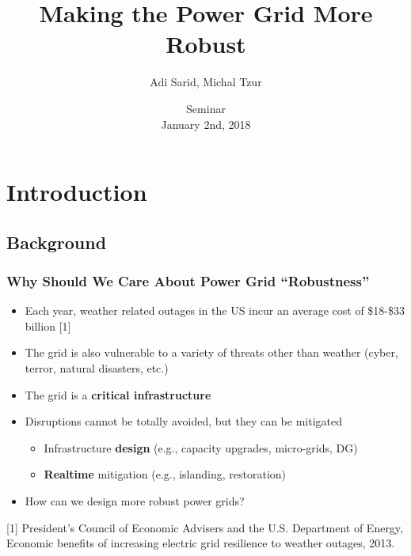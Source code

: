 \documentclass{beamer}
\title[Making the Power Grid More Robust]{Making the Power Grid More Robust}
\author[Sarid, Tzur]{Adi Sarid, Michal Tzur}
\institute[Tel-Aviv University]{\normalsize Department of Industrial Engineering, Tel-Aviv University, Israel}
\date{Seminar\\January 2nd, 2018}
\begin{document}
\begin{frame}
  \titlepage
\end{frame}


\section{Introduction}
\subsection{Background}
\begin{frame}
\frametitle{Why Should We Care About Power Grid ``Robustness''}
\begin{itemize}
	\item Each year, weather related outages in the US incur an average cost of \$18-\$33 billion [1]
	\item The grid is also vulnerable to a variety of threats other than weather (cyber, terror, natural disasters, etc.)
	\item The grid is a \textbf{critical infrastructure}
	\item Disruptions cannot be totally avoided, but they can be mitigated
	\begin{itemize}
		\item Infrastructure \textbf{design} (e.g., capacity upgrades, micro-grids, DG)
		\item \textbf{Realtime} mitigation (e.g., islanding, restoration)
	\end{itemize}
  \item How can we design more robust power grids?
\end{itemize}
\vspace{0.2in}
\tiny [1] President's Council of Economic Advisers and the U.S. Department of Energy, Economic benefits of increasing electric grid resilience to weather outages, 2013.
\end{frame}
\end{document}
